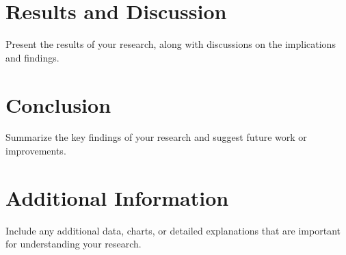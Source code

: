 \documentclass[12pt]{report}
\begin{document}
\newpage
\chapter{Results and Discussion}
Present the results of your research, along with discussions on the implications and findings.

\chapter{Conclusion}
Summarize the key findings of your research and suggest future work or improvements.

\newpage
\sloppy
\printbibliography
\newpage

\appendix
\chapter{Additional Information}
Include any additional data, charts, or detailed explanations that are important for understanding your research.
\end{document}
